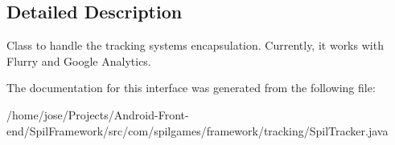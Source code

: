 \subsection{Detailed Description}
Class to handle the tracking systems encapsulation. Currently, it works with Flurry and Google Analytics. 

The documentation for this interface was generated from the following file\-:\begin{DoxyCompactItemize}
\item 
/home/jose/\-Projects/\-Android-\/\-Front-\/end/\-Spil\-Framework/src/com/spilgames/framework/tracking/Spil\-Tracker.\-java\end{DoxyCompactItemize}
